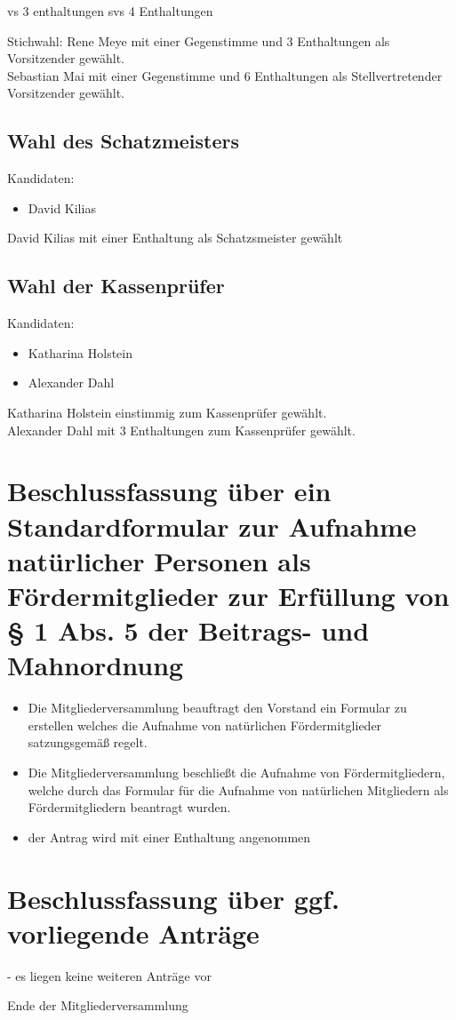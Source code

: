 \documentclass[a4paper,12pt,titlepage]{scrartcl}
\begin{document}
vs 3 enthaltungen
svs 4 Enthaltungen

Stichwahl:
Rene Meye mit einer Gegenstimme und 3 Enthaltungen als Vorsitzender gewählt. \\
Sebastian Mai mit einer Gegenstimme und 6 Enthaltungen als Stellvertretender Vorsitzender gewählt.

\subsection{Wahl des Schatzmeisters}
Kandidaten:
\begin{itemize}
	\item David Kilias
\end{itemize}
David Kilias mit einer Enthaltung als Schatzsmeister gewählt

\subsection{Wahl der Kassenprüfer}
Kandidaten:
\begin{itemize}
  \item Katharina Holstein
  \item Alexander Dahl
\end{itemize}

Katharina Holstein einstimmig zum Kassenprüfer gewählt. \\
Alexander Dahl mit 3 Enthaltungen zum Kassenprüfer gewählt.

\section{Beschlussfassung über ein Standardformular zur Aufnahme natürlicher Personen als Fördermitglieder zur Erfüllung von § 1
Abs. 5 der Beitrags- und Mahnordnung}
\begin{itemize}
	\item Die Mitgliederversammlung beauftragt den Vorstand ein Formular zu erstellen 
	welches die Aufnahme von natürlichen Fördermitglieder satzungsgemäß regelt.
	\item Die Mitgliederversammlung beschließt die Aufnahme von Fördermitgliedern, 
	welche durch das Formular für die Aufnahme von natürlichen Mitgliedern als Fördermitgliedern beantragt wurden.
	\item der Antrag wird mit einer Enthaltung angenommen
\end{itemize}
\section{Beschlussfassung über ggf. vorliegende Anträge}
- es liegen keine weiteren Anträge vor

Ende der Mitgliederversammlung
\end{document}
